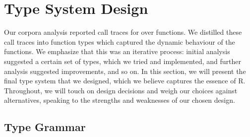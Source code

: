 \documentclass[acmsmall,review,anonymous]{acmart}\settopmatter{printfolios=true,printccs=false,printacmref=false}
\begin{document}
%
%
%
%
%
%
\section{Type System Design}
\label{sec:typesystemdesign}

Our corpora analysis reported  call traces for over  functions.
We distilled these call traces into function types which captured the dynamic behaviour of the functions.
We emphasize that this was an iterative process: initial analysis suggested a certain set of types, which we tried and implemented, and further analysis suggested improvements, and so on.
In this section, we will present the final type system that we designed, which we believe captures the essence of R.
Throughout, we will touch on design decisions and weigh our choices against alternatives, speaking to the strengths and weaknesses of our chosen design.

\subsection{Type Grammar}
\label{subsec:typegrammar}
\end{document}
